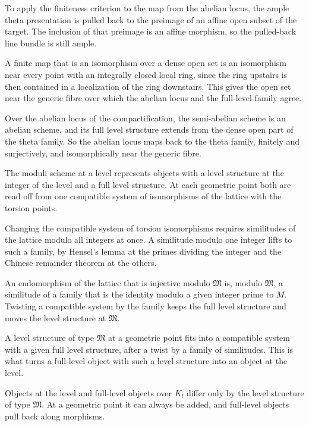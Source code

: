 To apply the finiteness criterion to the map from the abelian locus, the ample theta presentation is
pulled back to the preimage of an affine open subset of the target. The inclusion of that preimage is an
affine morphism, so the pulled-back line bundle is still ample.

A finite map that is an isomorphism over a dense open set is an isomorphism near every point with an
integrally closed local ring, since the ring upstairs is then contained in a localization of the ring
downstairs. This gives the open set near the generic fibre over which the abelian locus and the
full-level family agree.

Over the abelian locus of the compactification, the semi-abelian scheme is an abelian scheme, and its
full level structure extends from the dense open part of the theta family. So the abelian locus maps
back to the theta family, finitely and surjectively, and isomorphically near the generic fibre.

The moduli scheme at a level represents objects with a level structure at the integer of the level and a
full level structure. At each geometric point both are read off from one compatible system of
isomorphisms of the lattice with the torsion points.

Changing the compatible system of torsion isomorphisms requires similitudes of the lattice modulo all
integers at once. A similitude modulo one integer lifts to such a family, by Hensel's lemma at the primes
dividing the integer and the Chinese remainder theorem at the others.

An endomorphism of the lattice that is injective modulo $\mathfrak M$ is, modulo $\mathfrak M$, a similitude
of a family that is the identity modulo a given integer prime to $M$. Twisting a compatible system by the
family keeps the full level structure and moves the level structure at $\mathfrak M$.

A level structure of type $\mathfrak M$ at a geometric point fits into a compatible system with a given
full level structure, after a twist by a family of similitudes. This is what turns a full-level object
with such a level structure into an object at the level.

Objects at the level and full-level objects over $K_l$ differ only by the level structure of type
$\mathfrak M$. At a geometric point it can always be added, and full-level objects pull back along
morphisms.

